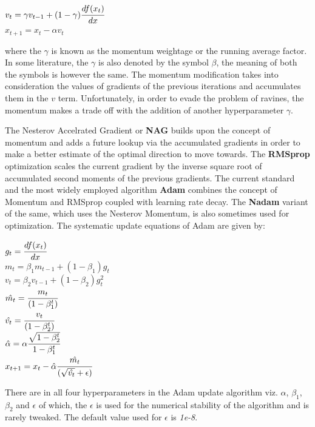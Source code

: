 \documentclass{article}
\begin{document}
\begin{center}
	$v_t = \gamma v_{t - 1} + (1 - \gamma) \cfrac{df(x_t)}{dx} $\\
	$x_{t + 1} = x_{t} - \alpha v_t$
\end{center}

where the $\gamma$ is known as the momentum weightage or the running average factor. In some literature, the $\gamma$ is also denoted by the symbol $\beta$, the meaning of both the symbols is however the same. The momentum modification takes into consideration the values of gradients of the previous iterations and accumulates them in the $v$ term. Unfortunately, in order to evade the problem of ravines, the momentum makes a trade off with the addition of another hyperparameter $\gamma$.


The Nesterov Accelrated Gradient or \textbf{NAG} \cite{nesterov:momentum} builds upon the concept of momentum and adds a future lookup via the accumulated gradients in order to make a better estimate of the optimal direction to move towards. The \textbf{RMSprop} optimization scales the current gradient by the inverse square root of accumulated second moments of the previous gradients. The current standard and the most widely employed algorithm \textbf{Adam} \cite{kingma-ba:adam} combines the concept of Momentum and RMSprop coupled with learning rate decay. The \textbf{Nadam} variant of the same, which uses the Nesterov Momentum, is also sometimes used for optimization. The systematic update equations of Adam are given by:

\begin{center}
	$g_t = \cfrac{d f(x_t)}{dx}$ \\
	$m_t = \beta_1 m_{t-1} + (1 - \beta_1) g_t$ \\
	$v_t = \beta_2 v_{t-1} + (1 - \beta_2) g_t^2$ \\
	$\hat{m_t} = \cfrac{m_t}{(1 - \beta_1^t)}$ \\
	$\hat{v_t} = \cfrac{v_t}{(1 - \beta_2^t)}$ \\
	$\hat{\alpha} = \alpha \cfrac{\sqrt{1 - \beta_2^t}}{1 - \beta_1^t}$ \\
	$x_{t + 1} = x_{t} - \hat{\alpha} \cfrac{\hat{m_t}}{(\sqrt{\hat{v_t}} + \epsilon)}$\\
\end{center}

There are in all four hyperparameters in the Adam update algorithm viz. $\alpha$, $\beta_1$, $\beta_2$ and $\epsilon$ of which, the $\epsilon$ is used for the numerical stability of the algorithm and is rarely tweaked. The default value used for $\epsilon$ is \textit{1e-8}.
\end{document}
